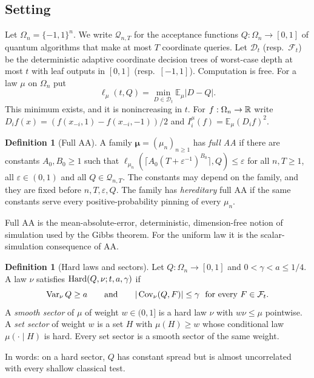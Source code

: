 \documentclass[11pt]{article}
\theoremstyle{definition}\newtheorem{definition}[theorem]{Definition}
\theoremstyle{remark}\newtheorem{remark}[theorem]{Remark}
\newcommand{\E}{\mathbb E}\newcommand{\Prb}{\mathbb P}
\newcommand{\mc}{\mathcal}\newcommand{\eps}{\varepsilon}
\begin{document}
\subsection{Setting}\label{dist:setting}
Let \(\Omega_n=\{-1,1\}^n\). We write \(\mc Q_{n,T}\) for the acceptance
functions \(Q:\Omega_n\to[0,1]\) of quantum algorithms that make at most \(T\)
coordinate queries. Let \(\mc D_t\) (resp.\ \(\mc F_t\)) be the deterministic
adaptive coordinate decision trees of worst-case depth at most \(t\) with leaf
outputs in \([0,1]\) (resp.\ \([-1,1]\)). Computation is free. For a law \(\mu\)
on \(\Omega_n\) put
\[
 \ell_\mu(t,Q)=\min_{D\in\mc D_t}\E_\mu|D-Q| .
\]
This minimum exists, and it is nonincreasing in \(t\). For
\(f:\Omega_n\to\mathbb R\) write \(D_if(x)=(f(x_{-i},1)-f(x_{-i},-1))/2\) and
\(I_i^\mu(f)=\E_\mu(D_if)^2\).

\begin{definition}[Full AA]\label{dist:full-aa}
A family \(\boldsymbol\mu=(\mu_n)_{n\ge1}\) has \emph{full AA} if there are
constants \(A_0,B_0\ge1\) such that
\(\ell_{\mu_n}(\lceil A_0(T+\eps^{-1})^{B_0}\rceil,Q)\le\eps\) for all
\(n,T\ge1\), all \(\eps\in(0,1)\) and all \(Q\in\mc Q_{n,T}\). The constants may
depend on the family, and they are fixed before \(n,T,\eps,Q\). The family has
\emph{hereditary} full AA if the same constants serve every positive-probability
pinning of every \(\mu_n\).
\end{definition}
Full AA is the mean-absolute-error, deterministic, dimension-free notion of
simulation used by the Gibbs theorem. For the uniform law it is the
scalar-simulation consequence of AA.

\begin{definition}[Hard laws and sectors]\label{dist:hard}
Let \(Q:\Omega_n\to[0,1]\) and \(0<\gamma<a\le1/4\). A law \(\nu\) satisfies
\(\operatorname{Hard}(Q,\nu;t,a,\gamma)\) if
\[
 \Var_\nu Q\ge a
 \qquad\text{and}\qquad
 |\Cov_\nu(Q,F)|\le\gamma\ \text{ for every }F\in\mc F_t .
\]
A \emph{smooth sector} of \(\mu\) of weight \(w\in(0,1]\) is a hard law \(\nu\)
with \(w\nu\le\mu\) pointwise. A \emph{set sector} of weight \(w\) is a set
\(H\) with \(\mu(H)\ge w\) whose conditional law \(\mu(\cdot\mid H)\) is hard.
Every set sector is a smooth sector of the same weight.
\end{definition}
In words: on a hard sector, \(Q\) has constant spread but is almost
uncorrelated with every shallow classical test.
\end{document}
